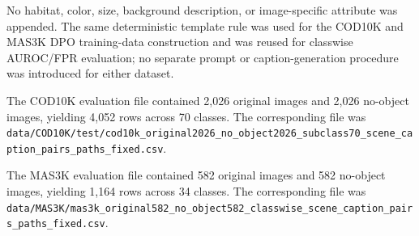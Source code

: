 No habitat, color, size, background description, or image-specific attribute was appended. The same deterministic template rule was used for the COD10K and MAS3K DPO training-data construction and was reused for classwise AUROC/FPR evaluation; no separate prompt or caption-generation procedure was introduced for either dataset.

The COD10K evaluation file contained 2,026 original images and 2,026 no-object images, yielding 4,052 rows across 70 classes. The corresponding file was \texttt{data/COD10K/test/cod10k\_original2026\_no\_object2026\_subclass70\_scene\_caption\_pairs\_paths\_fixed.csv}.

The MAS3K evaluation file contained 582 original images and 582 no-object images, yielding 1,164 rows across 34 classes. The corresponding file was \texttt{data/MAS3K/mas3k\_original582\_no\_object582\_classwise\_scene\_caption\_pairs\_paths\_fixed.csv}.
